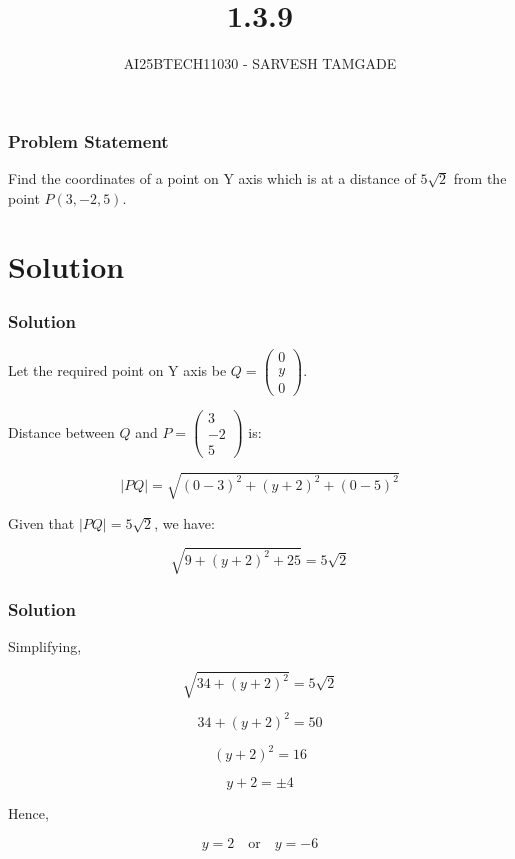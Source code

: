 \documentclass{beamer}
\title{1.3.9}
\author{AI25BTECH11030 - SARVESH TAMGADE}
\theoremstyle{remark}
\numberwithin{equation}{section}
\numberwithin{equation}{section}
\begin{document}
\begin{frame}
\titlepage
\end{frame}

\begin{frame}
\frametitle{Problem Statement}

Find the coordinates of a point on Y axis which is at a distance of \( 5\sqrt{2} \) from the point \( P(3, -2, 5) \).

\end{frame}

\section{Solution}

\begin{frame}
\frametitle{Solution}

Let the required point on Y axis be \( Q = \begin{pmatrix} 0 \\ y \\ 0 \end{pmatrix} \).

\vspace{1em}

Distance between \( Q \) and \( P = \begin{pmatrix} 3 \\ -2 \\ 5 \end{pmatrix} \) is:

\[
|PQ| = \sqrt{(0-3)^2 + (y+2)^2 + (0-5)^2}
\]

Given that \( |PQ| = 5\sqrt{2} \), we have:

\[
\sqrt{9 + (y+2)^2 + 25} = 5\sqrt{2}
\]

\end{frame}

\begin{frame}
\frametitle{Solution}

Simplifying,

\[
\sqrt{34 + (y+2)^2} = 5\sqrt{2}
\]

\[
34 + (y+2)^2 = 50
\]

\[
(y+2)^2 = 16
\]

\[
y + 2 = \pm 4
\]

Hence,

\[
y = 2 \quad \text{or} \quad y = -6
\]

\end{frame}
\end{document}
